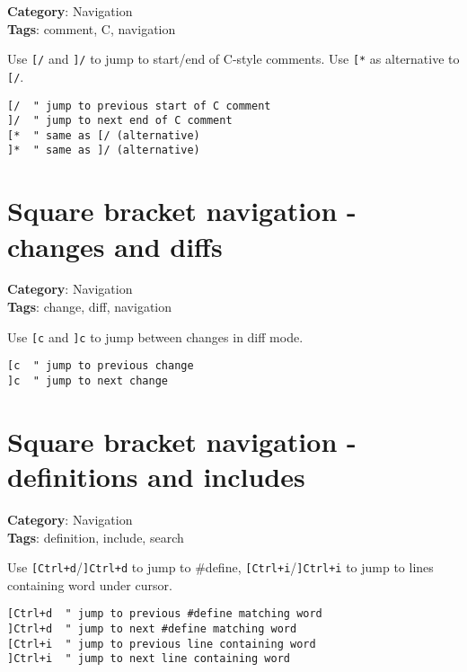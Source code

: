 {{{{{{{{{\textbf{Category}: Navigation\\ \textbf{Tags}: comment, C, navigation
\vspace{0.5cm}

Use {\footnotesize \Verb§[/§} and {\footnotesize \Verb§]/§} to jump to start/end of C-style comments. Use {\footnotesize \Verb§[*§} as alternative to {\footnotesize \Verb§[/§}.

\begin{Exa*}{}
\begin{Verbatim}[fontsize=\footnotesize, breaklines, breakanywhere]
[/  " jump to previous start of C comment
]/  " jump to next end of C comment
[*  " same as [/ (alternative)
]*  " same as ]/ (alternative)
\end{Verbatim}
\end{Exa*}

\section{Square bracket navigation - changes and diffs}

\textbf{Category}: Navigation\\ \textbf{Tags}: change, diff, navigation
\vspace{0.5cm}

Use {\footnotesize \Verb§[c§} and {\footnotesize \Verb§]c§} to jump between changes in diff mode.

\begin{Exa*}{}
\begin{Verbatim}[fontsize=\footnotesize, breaklines, breakanywhere]
[c  " jump to previous change
]c  " jump to next change
\end{Verbatim}
\end{Exa*}

\section{Square bracket navigation - definitions and includes}

\textbf{Category}: Navigation\\ \textbf{Tags}: definition, include, search
\vspace{0.5cm}

Use {\footnotesize \Verb§[Ctrl+d§}/{\footnotesize \Verb§]Ctrl+d§} to jump to \#define, {\footnotesize \Verb§[Ctrl+i§}/{\footnotesize \Verb§]Ctrl+i§} to jump to lines containing word under cursor.

\begin{Exa*}{}
\begin{Verbatim}[fontsize=\footnotesize, breaklines, breakanywhere]
[Ctrl+d  " jump to previous #define matching word
]Ctrl+d  " jump to next #define matching word
[Ctrl+i  " jump to previous line containing word
]Ctrl+i  " jump to next line containing word
\end{Verbatim}
\end{Exa*}

}}}}}}}}}
